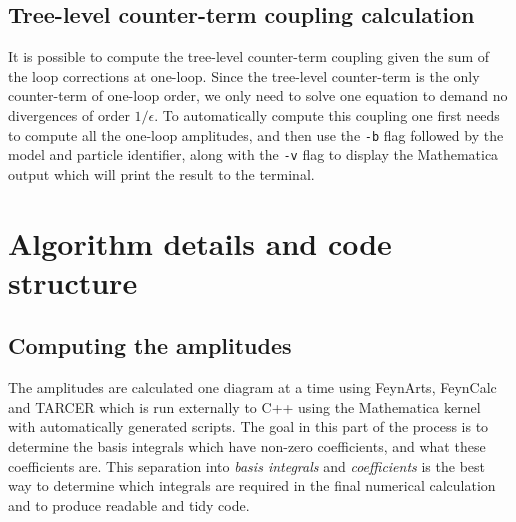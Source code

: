 \subsection{Tree-level counter-term coupling calculation}\label{sec:ct}

It is possible to compute the tree-level counter-term coupling given the sum of the loop corrections at one-loop.  Since the tree-level counter-term is the only counter-term of one-loop order, we only need to solve one equation to demand no divergences of order $1/\epsilon$.  To automatically compute this coupling one first needs to compute all the one-loop amplitudes, and then use the \lstinline{-b} flag followed by the model and particle identifier, along with the \lstinline{-v} flag to display the Mathematica output which will print the result to the terminal.


\section{Algorithm details and code structure}

\subsection{Computing the amplitudes}\label{sec:amplitudes}

The amplitudes are calculated one diagram at a time using FeynArts, FeynCalc and TARCER which is run externally to C++ using the Mathematica kernel with automatically generated scripts.  The goal in this part of the process is to determine the basis integrals which have non-zero coefficients, and what these coefficients are.  This separation into \textit{basis integrals} and \textit{coefficients} is the best way to determine which integrals are required in the final numerical calculation and to produce readable and tidy code.

